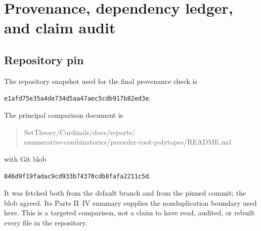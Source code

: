 \documentclass[11pt]{article}
\numberwithin{equation}{section}
\theoremstyle{definition}
\begin{document}
\section{Provenance, dependency ledger, and claim audit}
\label{ade:app:audit}

\subsection{Repository pin}

The repository snapshot used for the final provenance check is
\begin{center}
\texttt{e1afd75e35a4de734d5aa47aec5cdb917b82ed3e}.
\end{center}
The principal comparison document is
\begin{quote}\small\ttfamily
SetTheory/Cardinals/docs/reports/\\
enumerative-combinatorics/preorder-root-polytopes/README.md
\end{quote}
with Git blob
\begin{center}
\texttt{846d9f19fadac9cd933b74370cdb8fafa2211c5d}.
\end{center}
It was fetched both from the default branch and from the pinned commit;
the blob agreed.  Its Parts II--IV summary supplies the nonduplication
boundary used here.  This is a targeted comparison, not a claim to have
read, audited, or rebuilt every file in the repository.
\end{document}
